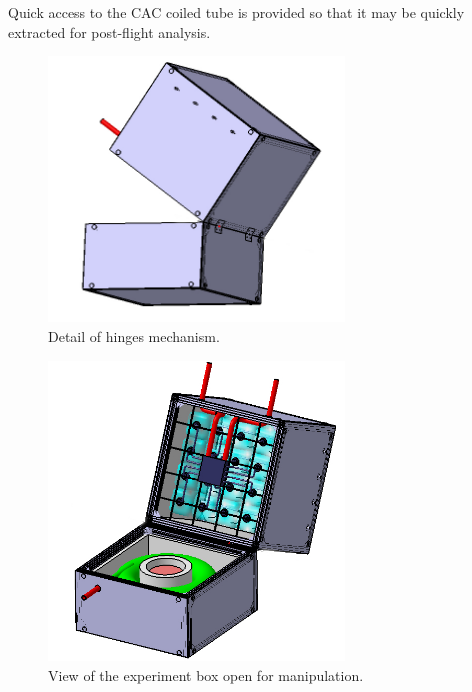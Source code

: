 \documentclass[a4paper,12pt,twoside]{article}
\begin{document}
Quick access to the CAC coiled tube is provided so that it may be quickly extracted for post-flight analysis.


\begin{figure}[!ht]
    \centering
    \includegraphics[width=0.7\textwidth]{4-experiment-design/img/hinges.jpg}
    \caption{Detail of hinges mechanism.}
    \label{open_box_1}
\end{figure}


\begin{figure}[!ht]
    \centering
    \includegraphics[width=0.7\textwidth]{4-experiment-design/img/open_box.jpg}
    \caption{View of the experiment box open for manipulation.}
    \label{open_box_2}
\end{figure}
\end{document}
